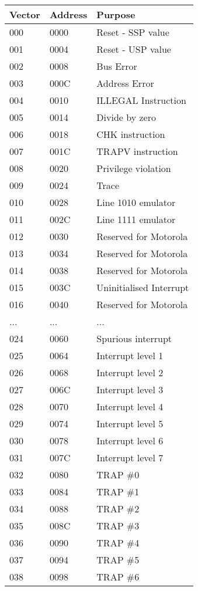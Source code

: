\begin{table}[htbp]
\centering
\begin{tabular}{l l l} %
\toprule
\textbf{Vector} & \textbf{Address} & \textbf{Purpose}\\
\midrule
%
000 & 0000 & Reset -{} SSP value \\
001 & 0004 & Reset -{} USP value \\
002 & 0008 & Bus Error \\
003 & 000C & Address Error \\
004 & 0010 & ILLEGAL Instruction \\
005 & 0014 & Divide by zero \\
006 & 0018 & CHK instruction \\
007 & 001C & TRAPV instruction \\
008 & 0020 & Privilege violation \\
009 & 0024 & Trace \\
010 & 0028 & Line 1010 emulator \\
011 & 002C & Line 1111 emulator \\
012 & 0030 & Reserved for Motorola \\
013 & 0034 & Reserved for Motorola \\
014 & 0038 & Reserved for Motorola \\
015 & 003C & Uninitialised Interrupt \\
016 & 0040 & Reserved for Motorola \\
... & ... & ... \\
024 & 0060 & Spurious interrupt \\
025 & 0064 & Interrupt level 1 \\
026 & 0068 & Interrupt level 2 \\
027 & 006C & Interrupt level 3 \\
028 & 0070 & Interrupt level 4 \\
029 & 0074 & Interrupt level 5 \\
030 & 0078 & Interrupt level 6 \\
031 & 007C & Interrupt level 7 \\
032 & 0080 & TRAP \#0 \\
033 & 0084 & TRAP \#1 \\
034 & 0088 & TRAP \#2 \\
035 & 008C & TRAP \#3 \\
036 & 0090 & TRAP \#4 \\
037 & 0094 & TRAP \#5 \\
038 & 0098 & TRAP \#6 \\

\end{tabular}
\end{table}
